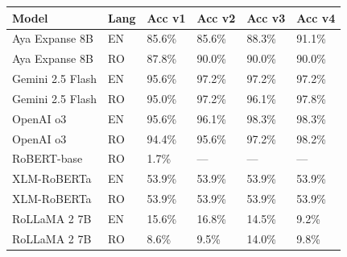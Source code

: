 \begin{tabular}{llllll}
\toprule
 Model            & Lang   & Acc v1   & Acc v2   & Acc v3   & Acc v4   \\
\midrule
 Aya Expanse 8B   & EN     & 85.6\%    & 85.6\%    & 88.3\%    & 91.1\%    \\
 Aya Expanse 8B   & RO     & 87.8\%    & 90.0\%    & 90.0\%    & 90.0\%    \\
 Gemini 2.5 Flash & EN     & 95.6\%    & 97.2\%    & 97.2\%    & 97.2\%    \\
 Gemini 2.5 Flash & RO     & 95.0\%    & 97.2\%    & 96.1\%    & 97.8\%    \\
 OpenAI o3        & EN     & 95.6\%    & 96.1\%    & 98.3\%    & 98.3\%    \\
 OpenAI o3        & RO     & 94.4\%    & 95.6\%    & 97.2\%    & 98.2\%    \\
 RoBERT-base      & RO     & 1.7\%     & —        & —        & —        \\
 XLM-RoBERTa      & EN     & 53.9\%    & 53.9\%    & 53.9\%    & 53.9\%    \\
 XLM-RoBERTa      & RO     & 53.9\%    & 53.9\%    & 53.9\%    & 53.9\%    \\
 RoLLaMA 2 7B     & EN     & 15.6\%    & 16.8\%    & 14.5\%    & 9.2\%     \\
 RoLLaMA 2 7B     & RO     & 8.6\%     & 9.5\%     & 14.0\%    & 9.8\%     \\
\bottomrule
\end{tabular}